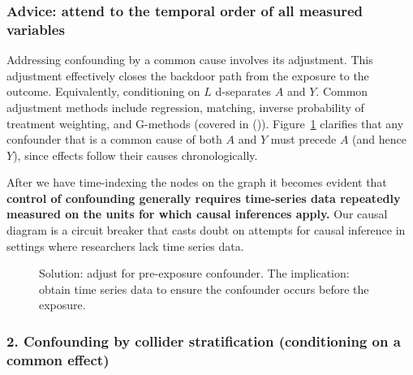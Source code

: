 \documentclass[
  singlecolumn]{article}
\begin{document}
\subsubsection{Advice: attend to the temporal order of all measured
variables}\label{advice-attend-to-the-temporal-order-of-all-measured-variables}

Addressing confounding by a common cause involves its adjustment. This
adjustment effectively closes the backdoor path from the exposure to the
outcome. Equivalently, conditioning on \(L\) d-separates \(A\) and
\(Y\). Common adjustment methods include regression, matching, inverse
probability of treatment weighting, and G-methods (covered in
()).
Figure~\ref{fig-dag-common-cause-solution} clarifies that any confounder
that is a common cause of both \(A\) and \(Y\) must precede \(A\) (and
hence \(Y\)), since effects follow their causes chronologically.

After we have time-indexing the nodes on the graph it becomes evident
that \textbf{control of confounding generally requires time-series data
repeatedly measured on the units for which causal inferences apply.} Our
causal diagram is a circuit breaker that casts doubt on attempts for
causal inference in settings where researchers lack time series data.

\begin{figure}


\caption{\label{fig-dag-common-cause-solution}Solution: adjust for
pre-exposure confounder. The implication: obtain time series data to
ensure the confounder occurs before the exposure.}

\end{figure}%

\subsubsection{2. Confounding by collider stratification (conditioning
on a common
effect)}\label{confounding-by-collider-stratification-conditioning-on-a-common-effect}
\end{document}
